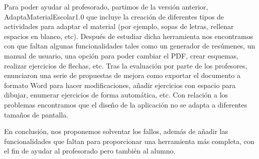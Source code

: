 Para poder ayudar al profesorado, partimos de la versión anterior, AdaptaMaterialEscolar1.0 que incluye la creación de diferentes tipos de actividades para adaptar el material (por ejemplo, sopas de letras, rellenar espacios en blanco, etc). Después de estudiar dicha herramienta nos encontramos con que faltan algunas funcionalidades tales como un generador de resúmenes, un manual de usuario, una opción para poder cambiar el PDF, crear esquemas, realizar ejercicios de flechas, etc. Tras la evaluación por parte de los profesores, enunciaron una serie de propuestas de mejora como exportar el documento a formato Word para hacer modificaciones, añadir ejercicios con espacio para dibujar, enumerar ejercicios de forma automática, etc. Con relación a los problemas encontramos que el diseño de la aplicación no se adapta a diferentes tamaños de pantalla. 

En conclusión, nos proponemos solventar los fallos, además de añadir las funcionalidades que faltan para proporcionar una herramienta más completa, con el fin de ayudar al profesorado pero también al alumno. 

